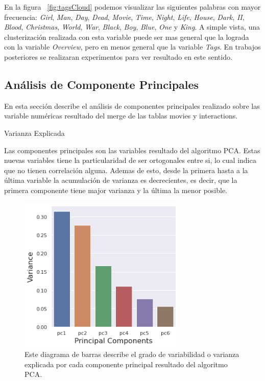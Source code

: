 \documentclass[11pt,a4paper,twoside]{thesis}
\begin{document}
En la figura ~\ref{fig:tagsCloud} podemos visualizar las siguientes palabras con mayor frecuencia: \textit{Girl}, \textit{Man}, \textit{Day}, \textit{Dead}, \textit{Movie}, \textit{Time}, \textit{Night}, \textit{Life}, \textit{House}, \textit{Dark}, \textit{II}, \textit{Blood}, \textit{Christmas}, \textit{World}, \textit{War}, \textit{Black}, \textit{Boy}, \textit{Blue}, \textit{One} y \textit{King}. A simple vista, una clusterización realizada con esta variable puede ser mas general que la lograda con la variable \textit{Overview}, pero en menos general que la variable \textit{Tags}. En trabajos posteriores se realizaran experimentos para ver resultado en este sentido.


\clearpage

\subsection{Análisis de Componente Principales}

En esta sección describe el análisis de componentes principales realizado sobre las variable numéricas resultado del merge de las tablas movies y interactions.

\begin{description}
	\item[Varianza Explicada]
\end{description}

Las componentes principales son las variables resultado del algoritmo PCA. Estas nuevas variables tiene la particularidad de ser ortogonales entre si, lo cual indica que no tienen correlación alguna. Ademas de esto, desde la primera hasta a la última variable la acumulación de varianza es decrecientes, es decir, que la primera componente tiene major varianza y la última la menor posible. 


\begin{figure}[h!]
	\centering
	\includegraphics[width=8cm]{./images/PCA-Variance.png}
	\caption{Este diagrama de barras describe el grado de variabilidad o varianza explicada por cada componente principal resultado del algoritmo PCA.}
	\label{fig:explainedVariancePlot}
\end{figure}
\end{document}
